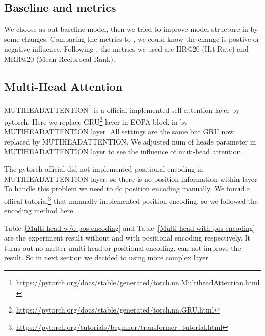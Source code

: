 \documentclass{article}
\begin{document}
\subsection{Baseline and metrics}

We choose \cite{chen2020lessr} as out baseline model,
then we tried to improve model structure in \cite{chen2020lessr} by some changes.
Comparing the metrics to \cite{chen2020lessr},
we could know the change is postive or negative influence.
Following \cite{chen2020lessr},
the metrics we used are HR@20 (Hit Rate) and MRR@20 (Mean Reciprocal Rank).

\subsection{Multi-Head Attention}

MUTIHEADATTENTION\footnote{\url{https://pytorch.org/docs/stable/generated/torch.nn.MultiheadAttention.html}}
is a official implemented self-attention layer by pytorch.
Here we replace GRU\footnote{\url{https://pytorch.org/docs/stable/generated/torch.nn.GRU.html}}
layer in EOPA block in \cite{chen2020lessr} by MUTIHEADATTENTION layer.
All settings are the same but GRU now replaced by MUTIHEADATTENTION.
We adjusted num of heads parameter in MUTIHEADATTENTION layer
to see the influence of muti-head attention.

The pytorch official did not implemented positional encoding in
MUTIHEADATTENTION layer, so there is no position information within layer.
To handle this problem we need to do position encoding manually.
We fonud a offical tutorial\footnote{\url{https://pytorch.org/tutorials/beginner/transformer_tutorial.html}}
that manually implemented position encoding,
so we followed the encoding method here.

Table~\ref{Multi-head w/o pos encoding} and Table~\ref{Multi-head with pos encoding}
are the experiment result without and with positional encoding respectively.
It turns out no matter multi-head or positional encoding, can not improve the result.
So in next section we decided to using more complex layer.
\end{document}
